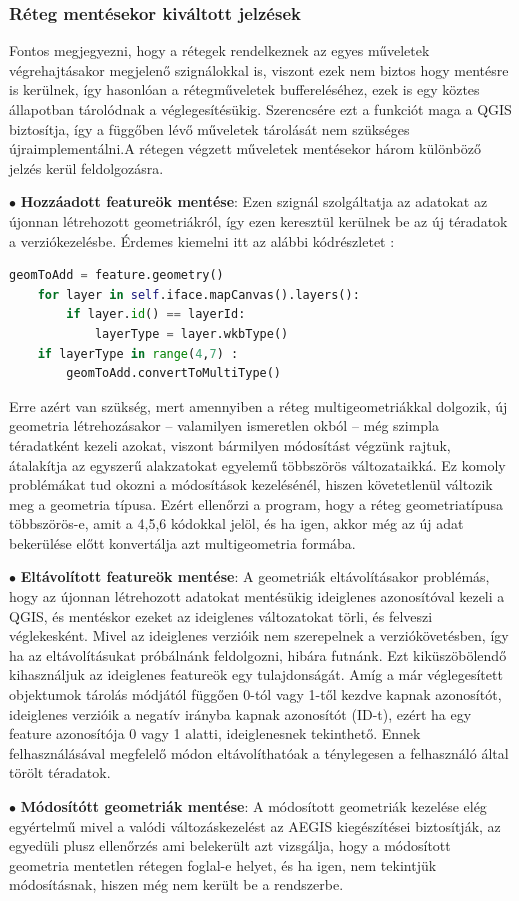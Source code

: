 \subsubsection{Réteg mentésekor kiváltott jelzések}
Fontos megjegyezni, hogy a rétegek rendelkeznek az egyes műveletek végrehajtásakor megjelenő szignálokkal is, viszont ezek nem biztos hogy mentésre is kerülnek, így hasonlóan a rétegműveletek buffereléséhez, ezek is egy köztes állapotban tárolódnak a véglegesítésükig. Szerencsére ezt a funkciót maga a QGIS biztosítja, így a függőben lévő műveletek tárolását nem szükséges újraimplementálni.A rétegen végzett műveletek mentésekor három különböző jelzés kerül feldolgozásra.
\begin{list}{}{}
	\item $\bullet$ \textbf{Hozzáadott featureök mentése}: Ezen szignál szolgáltatja az adatokat az újonnan létrehozott geometriákról, így ezen keresztül kerülnek be az új téradatok a verziókezelésbe. Érdemes kiemelni itt az alábbi kódrészletet : 
	\begin{lstlisting}[language={python}]
	geomToAdd = feature.geometry()
	for layer in self.iface.mapCanvas().layers():
		if layer.id() == layerId:
			layerType = layer.wkbType()
	if layerType in range(4,7) :
		geomToAdd.convertToMultiType()
	\end{lstlisting}
	Erre azért van szükség, mert amennyiben a réteg multigeometriákkal dolgozik, új geometria létrehozásakor -- valamilyen ismeretlen okból -- még szimpla téradatként kezeli azokat, viszont bármilyen módosítást végzünk rajtuk, átalakítja az egyszerű alakzatokat egyelemű többszörös változataikká. Ez komoly problémákat tud okozni a módosítások kezelésénél, hiszen követetlenül változik meg a geometria típusa. Ezért ellenőrzi a program, hogy a réteg geometriatípusa többszörös-e, amit a 4,5,6 kódokkal jelöl, és ha igen, akkor még az új adat bekerülése előtt konvertálja azt multigeometria formába.
	\item $\bullet$ \textbf{Eltávolított featureök mentése}: A geometriák eltávolításakor problémás, hogy az újonnan létrehozott adatokat mentésükig ideiglenes azonosítóval kezeli a QGIS, és mentéskor ezeket az ideiglenes változatokat törli, és felveszi véglekesként. Mivel az ideiglenes verzióik nem szerepelnek a verziókövetésben, így ha az eltávolításukat próbálnánk feldolgozni, hibára futnánk. Ezt kiküszöbölendő kihasználjuk az ideiglenes featureök egy tulajdonságát. Amíg a már véglegesített objektumok tárolás módjától függően 0-tól vagy 1-től kezdve kapnak azonosítót, ideiglenes verzióik a negatív irányba kapnak azonosítót (ID-t), ezért ha egy feature azonosítója 0 vagy 1 alatti, ideiglenesnek tekinthető. Ennek felhasználásával megfelelő módon eltávolíthatóak a ténylegesen a felhasználó által törölt téradatok.
	\item $\bullet$ \textbf{Módosítótt geometriák mentése}: A módosított geometriák kezelése elég egyértelmű mivel a valódi változáskezelést az AEGIS kiegészítései biztosítják, az egyedüli plusz ellenőrzés ami belekerült azt vizsgálja, hogy a módosított geometria mentetlen rétegen foglal-e helyet, és ha igen, nem tekintjük módosításnak, hiszen még nem került be a rendszerbe.

\end{list}
